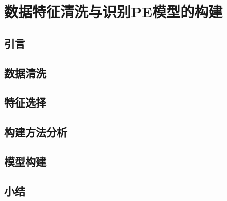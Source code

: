 \chapter{数据特征清洗与识别PE模型的构建}
\section{引言}

\section{数据清洗}
\section{特征选择}
\section{构建方法分析}
\section{模型构建}
\section{小结}